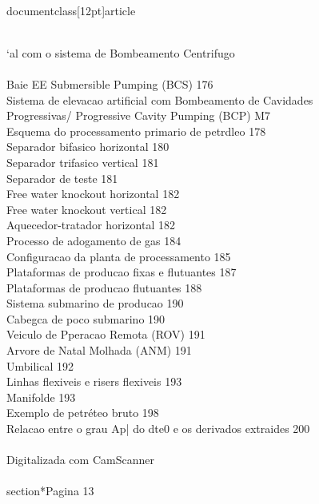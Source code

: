 \\documentclass[12pt]{article}
\begin{document}
\\
‘al com o sistema de Bombeamento Centrifugo\\
\\
Baie EE Submersible Pumping (BCS) 176\\
Sistema de elevacao artificial com Bombeamento de Cavidades\\
Progressivas/ Progressive Cavity Pumping (BCP) M7\\
Esquema do processamento primario de petrdleo 178\\
Separador bifasico horizontal 180\\
Separador trifasico vertical 181\\
Separador de teste 181\\
Free water knockout horizontal 182\\
Free water knockout vertical 182\\
Aquecedor-tratador horizontal 182\\
Processo de adogamento de gas 184\\
Configuracao da planta de processamento 185\\
Plataformas de producao fixas e flutuantes 187\\
Plataformas de producao flutuantes 188\\
Sistema submarino de producao 190\\
Cabegca de poco submarino 190\\
Veiculo de Pperacao Remota (ROV) 191\\
Arvore de Natal Molhada (ANM) 191\\
Umbilical 192\\
Linhas flexiveis e risers flexiveis 193\\
Manifolde 193\\
Exemplo de petréteo bruto 198\\
Relacao entre o grau Ap| do dte0 e os derivados extraides 200\\
\\
Digitalizada com CamScanner\\

\\section*{Pagina 13}
\end{document}

